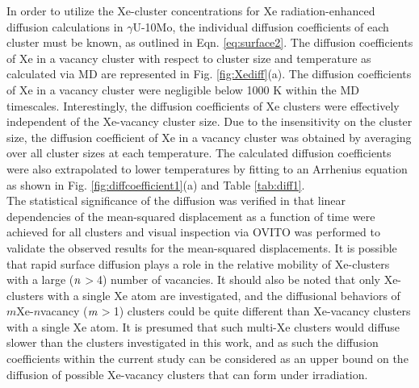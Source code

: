 \documentclass[preprint,12pt]{elsarticle}
\begin{document}
\FloatBarrier

\indent In order to utilize the Xe-cluster concentrations for Xe radiation-enhanced diffusion calculations in $\gamma$U-10Mo, the individual diffusion coefficients of each cluster must be known, as outlined in Eqn. \ref{eq:surface2}. The diffusion coefficients of Xe in a vacancy cluster with respect to cluster size and temperature as calculated via MD are represented in Fig. \ref{fig:Xediff}(a). The diffusion coefficients of Xe in a vacancy cluster were negligible below 1000 K within the MD timescales. Interestingly, the diffusion coefficients of Xe clusters were effectively independent of the Xe-vacancy cluster size. Due to the insensitivity on the cluster size, the diffusion coefficient of Xe in a vacancy cluster was obtained by averaging over all cluster sizes at each temperature. The calculated diffusion coefficients were also extrapolated to lower temperatures by fitting to an Arrhenius equation as shown in Fig. \ref{fig:diffcoefficient1}(a) and Table \ref{tab:diff1}. \\ 
\indent The statistical significance of the diffusion was verified in that linear dependencies of the mean-squared displacement as a function of time were achieved for all clusters and visual inspection via OVITO \cite{stukowski2009visualization} was performed to validate the observed results for the mean-squared displacements. It is possible that rapid surface diffusion plays a role in the relative mobility of Xe-clusters with a large ($\it{n}$$>$4) number of vacancies. It should also be noted that only Xe-clusters with a single Xe atom are investigated, and the diffusional behaviors of $m$Xe-$n$vacancy ($\it{m}$$>$1) clusters could be quite different than Xe-vacancy clusters with a single Xe atom. It is presumed that such multi-Xe clusters would diffuse slower than the clusters investigated in this work, and as such the diffusion coefficients within the current study can be considered as an upper bound on the diffusion of possible Xe-vacancy clusters that can form under irradiation. \\
\end{document}
